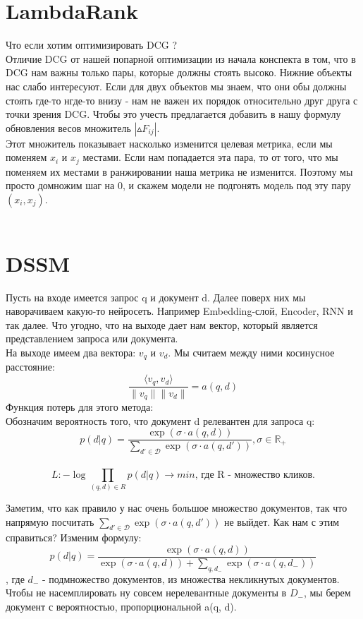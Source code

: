 \documentclass{article}
\begin{document}
\section{LambdaRank}
Что если хотим оптимизировать DCG ? \\Отличие DCG от нашей попарной оптимизации из начала конспекта в том, что в DCG нам важны только пары, которые должны стоять высоко. Нижние объекты нас слабо интересуют. Если для двух объектов мы знаем, что они обы должны стоять где-то нгде-то внизу - нам не важен их порядок относительно друг друга с точки зрения DCG. Чтобы это учесть предлагается добавить в нашу формулу обновления весов множитель $|\vartriangle F_{ij}|$. \\Этот множитель показывает насколько изменится целевая метрика, если мы поменяем $x_i$ и $x_j$ местами. Если нам попадается эта пара, то от того, что мы поменяем их местами в ранжировании наша метрика не изменится. Поэтому мы просто домножим шаг на 0, и скажем модели не подгонять модель под эту пару $(x_i, x_j)$. \\\\

\section{DSSM}

Пусть на входе имеется запрос q и документ d. Далее поверх них мы наворачиваем какую-то нейросеть. Например Embedding-слой, Encoder, RNN и так далее. Что угодно, что на выходе дает нам вектор, который является представлением запроса или документа. \\ На выходе имеем два вектора: $v_q$ и $v_d$. Мы считаем между ними косинусное расстояние: \\ $$\frac{\langle v_q, v_d\rangle}{\|v_q \| \|v_d \|}
= a(q,d)$$ Функция потерь для этого метода: \\  Обозначим вероятность того, что документ d релевантен для запроса q: $$p(d|q)=\frac{\exp(\sigma \cdot a(q,d))}{\sum\limits_{d' \in \mathcal{D}}{\exp(\sigma \cdot a(q, d'))}}, \sigma \in \mathbb{R}_+$$  \\ $$L: -\log\prod\limits_{(q,d) \in R}{p(d|q)} \rightarrow min \text{, где R - множество кликов.}$$ 

Заметим, что как правило у нас очень большое множество документов, так что напрямую посчитать $\sum\limits_{d' \in \mathcal{D}}{\exp(\sigma \cdot a(q, d'))}$ не выйдет. Как нам с этим справиться?  Изменим формулу: \\
$$p(d|q)=\frac{
\exp(\sigma \cdot a(q,d))
}{
\exp(\sigma \cdot a(q, d)) + \sum\limits_{q, d_-}{\exp(\sigma \cdot a(q, d_-))}
}$$, где $d_-$ - подмножество документов, из множества некликнутых документов. Чтобы не насемплировать ну совсем нерелевантные документы в $D_-$, мы берем документ с вероятностью, пропорциональной a(q, d). 
\end{document}
